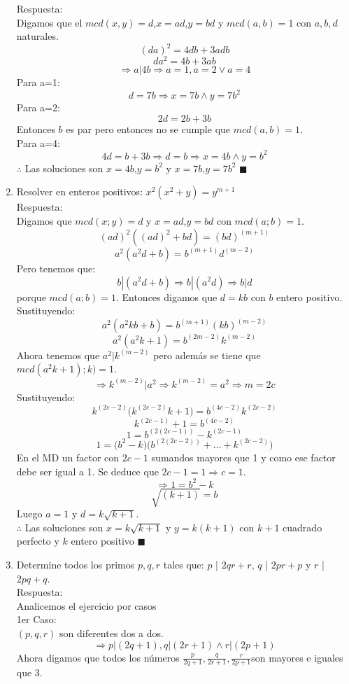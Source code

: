 \documentclass{book}
\begin{document}
\begin{enumerate}
			Respuesta:\\
			Digamos que el $mcd(x,y)=d$,$x=ad$,$y=bd$ y $mcd(a,b)=1$ con $a,b,d$ naturales.
$${(da)}^2  = 4db +3adb$$
$$da^2  = 4b +3ab$$
$$\Rightarrow a|4b \Rightarrow a=1,a=2 \vee a=4$$
Para a=1:
$$d = 7b\Rightarrow x=7b \wedge y=7b^2$$
Para a=2:
$$2d = 2b +3b$$ 
Entonces $b$ es par pero entonces no se cumple que $mcd(a,b)=1$.\\
Para a=4:
$$4d =b+3b\Rightarrow d=b\Rightarrow x=4b \wedge y=b^2$$
$\therefore$ Las soluciones son $x=4b$,$y=b^2$ y $x=7b$,$y=7b^2$ $\blacksquare$\\
			\item Resolver en enteros positivos: $x^2(x^2+y)=y^{m+1}$\\
			Respuesta:\\
			Digamos que $mcd(x;y)=d$ y $x=ad$,$y=bd$ con $mcd(a;b)=1$.
$${(ad)}^2 ({(ad)}^2+bd)={(bd)}^{(m+1)}$$
$$a^2 (a^2 d+b)=b^{(m+1)} d^{(m-2)}$$
Pero tenemos que: 
$$ b|(a^2 d+b )  \Rightarrow  b|(a^2 d) \Rightarrow b|d$$
 porque $mcd(a;b)=1$.
Entonces digamos que $d=kb$ con $b$ entero positivo.
Sustituyendo:
$$a^2 (a^2 kb+b)=b^{(m+1)} {(kb)}^{(m-2)}$$
$$a^2 (a^2 k+1)=b^{(2m-2)} k^{(m-2)}$$
Ahora tenemos que $a^2|k^{(m-2)}$  pero además se tiene que $mcd(a^2 k+1);k )=1$.\\ 
$$\Rightarrow k^{(m-2)}|a^2 \Rightarrow k^{(m-2)}=a^2\Rightarrow m=2c$$
Sustituyendo:
$$k^{(2c-2)} \big(k^{(2c-2)} k+1\big)=b^{(4c-2)} k^{(2c-2)}$$
$$k^{(2c-1)}+1=b^{(4c-2)}$$
$$1=b^{(2(2c-1))}-k^{(2c-1)}$$
$$1=\big(b^2-k)(b^{(2(2c-2))}+\ldots+k^{(2c-2)}\big)$$
En el MD un factor con $2c-1$ sumandos mayores que 1 y como ese factor debe ser igual a 1. Se deduce que $2c-1=1\Rightarrow c=1$.  
$$\Rightarrow 1=b^2-k$$
$$\sqrt{(k+1)}=b$$
Luego $a=1$ y $d=k\sqrt{k+1}$.\\
$\therefore$ Las soluciones son $x=k\sqrt{k+1}$ y $y=k(k+1)$ con $k+1$ cuadrado perfecto y $k$ entero positivo $\blacksquare$\\
			\item Determine todos los primos $p,q,r$ tales que: $p$ | $2qr+r$, $q$ | $2pr+p$ y $r$ | $2pq+q$.\\
			Respuesta:\\
			Analicemos el ejercicio por casos\\ 
				1er Caso: \\
$(p,q,r)$ son diferentes dos a dos.\\
$$\Rightarrow p|(2q + 1)  ,   q|(2r + 1)  \wedge  r|(2p + 1)$$  
Ahora digamos que todos los números $\displaystyle{\frac{p}{2q + 1}  ,   \frac{q}{2r + 1}  ,  \frac{r}{2p + 1}}$son mayores e iguales que 3.

\end{enumerate}
\end{document}
